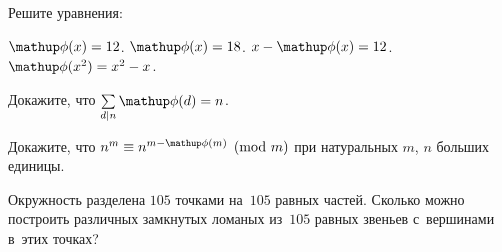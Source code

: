 \medskip

Решите уравнения:

\begin{problems}

\item
$\eulerphi(x) = 12$.
\qquad
\problem
$\eulerphi(x) = 18$.
\qquad
\problem
$x-\eulerphi(x) = 12$.
\qquad
\problem
$\eulerphi(x^2) = x^2 - x$.

\end{problems}

\medskip

\begin{problems}

\item
Докажите, что $\sum\limits_{d \divides n} \eulerphi(d) = n$.

\item
Докажите, что $n^m \equiv n^{m - \eulerphi(m)} \pmod{m}$ при натуральных
$m$, $n$ больших единицы.

\item
Окружность разделена $105$ точками на~$105$ равных частей.
Сколько можно построить различных замкнутых ломаных из~$105$ равных звеньев
с~вершинами в~этих точках?

\end{problems}

\endgroup %

